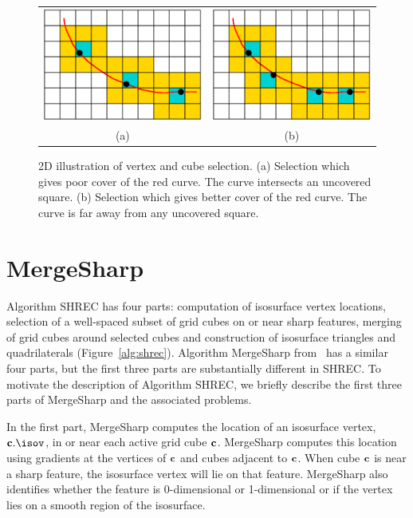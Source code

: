 \begin{figure}[t]
\centering

\begin{tabular}{cc}
\includegraphics[width=0.4\linewidth]{images/selectA.eps} \qquad &
\qquad
\includegraphics[width=0.4\linewidth]{images/selectB.eps} \\
(a) & (b) 
\end{tabular}

\caption{2D illustration of vertex and cube selection.
(a) Selection which gives poor cover of the red curve.
The curve intersects an uncovered square.
(b) Selection which gives better cover of the red curve.
The curve is far away from any uncovered square.
}
\label{fig:select}
\end{figure}


\section{MergeSharp}
\label{section:mergesharp}

Algorithm SHREC has four parts:
computation of isosurface vertex locations, 
selection of a well-spaced subset of grid cubes on or near sharp features,
merging of grid cubes around selected cubes
and construction of isosurface triangles and quadrilaterals
(Figure~\ref{alg:shrec}).
Algorithm MergeSharp from~\cite{bw-cisec-13} 
has a similar four parts,
but the first three parts are substantially different in SHREC.
To motivate the description of Algorithm SHREC,
we briefly describe the first three parts 
of MergeSharp and the associated problems.

In the first part, 
MergeSharp computes the location of an isosurface vertex, $\cb.\isov$,
in or near each active grid cube $\mathbf{c}$.
MergeSharp computes this location using gradients at the vertices of $\mathbf{c}$
and cubes adjacent to $\mathbf{c}$.
When cube $\mathbf{c}$ is near a sharp feature,
the isosurface vertex will lie on that feature.
MergeSharp also identifies whether the feature 
is 0-dimensional or 1-dimensional
or if the vertex lies on a smooth region of the isosurface.

